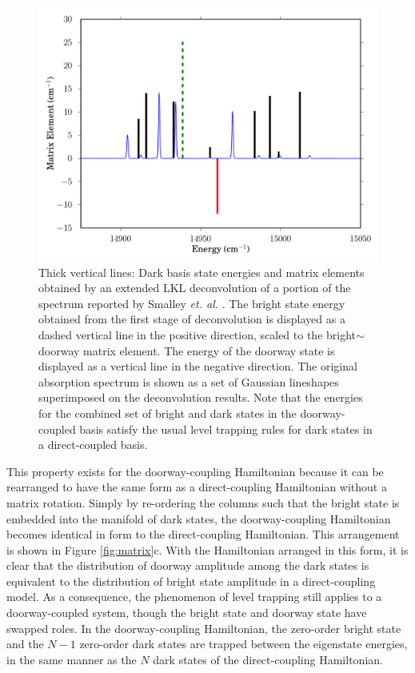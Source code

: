 \documentclass[12pt]{mitthesis}
\begin{document}
\begin{figure}
  \caption{Thick vertical lines: Dark basis state energies and matrix
    elements obtained by an extended LKL deconvolution of a portion of
    the  spectrum reported by Smalley \emph{et. al.}
    \cite{smalley75}.  The bright state energy obtained from the first
    stage of deconvolution is displayed as a dashed vertical line in
    the positive direction, scaled to the bright$\sim$doorway matrix
    element.  The energy of the doorway state is displayed as a
    vertical line in the negative direction.  The original absorption
    spectrum is shown as a set of Gaussian lineshapes superimposed on
    the deconvolution results.  Note that the energies for the
    combined set of bright and dark states in the doorway-coupled
    basis satisfy the usual level trapping rules for dark states in a
    direct-coupled basis.}
  \label{fig:smalley-doorway}
  \centering
  \includegraphics[width=6in]{smalley-doorway.png}
\end{figure}

This property exists for the doorway-coupling Hamiltonian because it
can be rearranged to have the same form as a direct-coupling
Hamiltonian without a matrix rotation.  Simply by re-ordering the
columns such that the bright state is embedded into the manifold of
dark states, the doorway-coupling Hamiltonian becomes identical in
form to the direct-coupling Hamiltonian.  This arrangement is shown in
Figure \ref{fig:matrix}c.  With the Hamiltonian arranged in this form,
it is clear that the distribution of doorway amplitude among the dark
states is equivalent to the distribution of bright state amplitude in
a direct-coupling model.  As a consequence, the phenomenon of level
trapping still applies to a doorway-coupled system, though the bright
state and doorway state have swapped roles.  In the doorway-coupling
Hamiltonian, the zero-order bright state and the $N-1$ zero-order dark
states are trapped between the eigenstate energies, in the same manner
as the $N$ dark states of the direct-coupling Hamiltonian.
\end{document}
